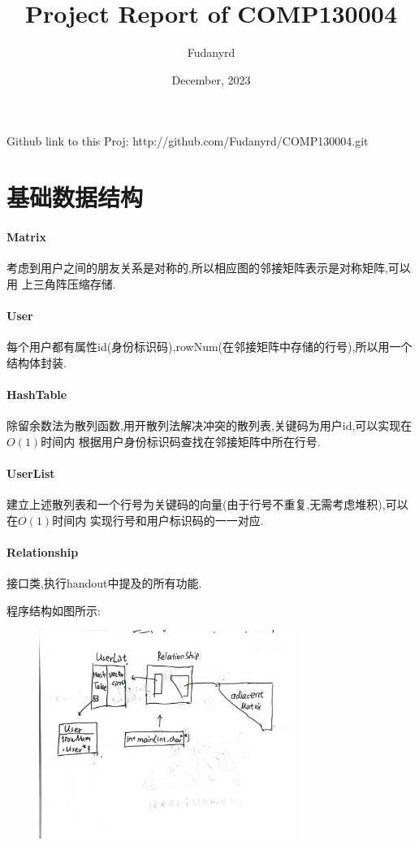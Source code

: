 \documentclass{article}
\title{Project Report of COMP130004}
\author{Fudanyrd}
\date{December, 2023}
\begin{document}
\begin{CJK*}{UTF8}{gbsn}
\maketitle
\par Github link to this Proj: http://github.com/Fudanyrd/COMP130004.git

\section{基础数据结构}

\paragraph{Matrix}
 考虑到用户之间的朋友关系是对称的,所以相应图的邻接矩阵表示是对称矩阵,可以用
上三角阵压缩存储.
\paragraph{User}
 每个用户都有属性id(身份标识码),rowNum(在邻接矩阵中存储的行号),所以用一个结构体封装.
\paragraph{HashTable}
除留余数法为散列函数,用开散列法解决冲突的散列表,关键码为用户id,可以实现在$O(1)$时间内
根据用户身份标识码查找在邻接矩阵中所在行号.
\paragraph{UserList}
建立上述散列表和一个行号为关键码的向量(由于行号不重复,无需考虑堆积),可以在$O(1)$时间内
实现行号和用户标识码的一一对应.
\paragraph{Relationship}
接口类,执行handout中提及的所有功能.
\par 程序结构如图所示:
\begin{figure}[H]
    \centering
    \includegraphics[width=0.75\textwidth]{explanation.jpg}
\end{figure}


\end{CJK*}
\end{document}
